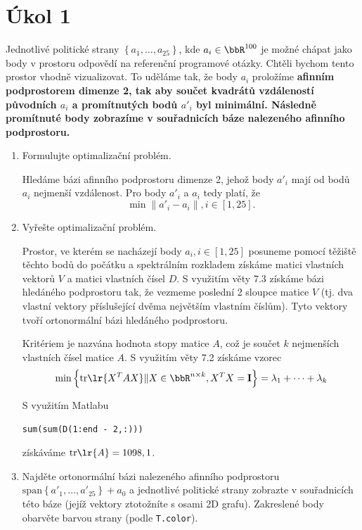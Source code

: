 

\section{Úkol 1}

Jednotlivé politické strany \( \left\{ a_1, \dots, a_{25} \right \} \), kde \( a_i \in \bbR^{100} \) je možné chápat jako body v prostoru odpovědí na referenční programové otázky. Chtěli bychom tento prostor vhodně vizualizovat. To uděláme tak, že body \( a_i \) proložíme \bf{afinním} podprostorem dimenze 2, tak aby součet kvadrátů vzdáleností původních \( a_i \) a promítnutých bodů \( a'_i \) byl minimální. Následně promítnuté body zobrazíme v souřadnicích báze nalezeného afinního podprostoru.

\begin{enumerate}
    \item Formulujte optimalizační problém.

    Hledáme bázi afinního podprostoru dimenze 2, jehož body \( a'_i \) mají od bodů \( a_i \) nej\-menší vzdálenost. Pro body \( a'_i \) a \( a_i \) tedy platí, že
    \[ \min \lVert a'_i - a_i \rVert, i \in \left[ 1, 25 \right]. \]

    \item Vyřešte optimalizační problém.

    Prostor, ve kterém se nacházejí body \( a_i, i \in \left[ 1, 25 \right] \) posuneme pomocí těžiště těchto bodů do počátku a spektrálním rozkladem získáme matici vlastních vektorů \( V \) a matici vlastních čísel \( D \). S využitím věty 7.3 získáme bázi hledáného podprostoru tak, že vezmeme poslední 2 sloupce matice \( V \) (tj. dva vlastní vektory příslušející dvěma největším vlastním číslům). Tyto vektory tvoří ortonormální bázi hledáného podprostoru.

    Kritériem je nazvána hodnota stopy matice \( A \), což je součet \( k \) nejmenších vlastních čísel matice \( A \). S využitím věty 7.2 získáme vzorec
    \[ \min \left\{ \mathrm{tr} \lr{X^T A X} \| X \in \bbR^{n \times k}, X^T X = \bf{I} \right\} = \lambda_1 + \cdots + \lambda_k \]

    S využitím Matlabu
    \begin{lstlisting}[style=Matlab-editor]
sum(sum(D(1:end - 2,:)))
    \end{lstlisting}

    získáváme \( \mathrm{tr} \lr{A} = 1 098,1 \).

    \item Najděte ortonormální bázi nalezeného afinního podprostoru \( \mathrm{span} \left\{ a'_1, \dots, a'_{25} \right \} + a_0 \) a jednotlivé politické strany zobrazte v souřadnicích této báze (jejíž vektory ztotožníte s osami 2D grafu). Zakreslené body obarvěte barvou strany (podle \verb|T.color|).


\end{enumerate}
